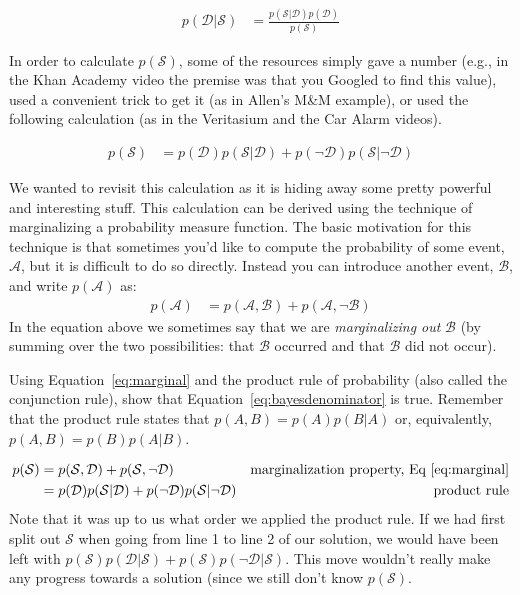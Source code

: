 \documentclass[assignment01_Solutions]{subfiles}
\begin{document}
\begin{align}
p(\mathcal{D} | \mathcal{S}) &= \frac{p(\mathcal{S} | \mathcal{D}) p(\mathcal{D})}{p(\mathcal{S})} \label{eq:bayesdenominator}
\end{align}

In order to calculate $p(\mathcal{S})$, some of the resources simply gave a number (e.g., in the Khan Academy video the premise was that you Googled to find this value), used a convenient trick to get it (as in Allen's M\&M example), or used the following calculation (as in the Veritasium and the Car Alarm videos).

\begin{align}
p(\mathcal{S}) &= p(\mathcal{D}) p(\mathcal{S}|\mathcal{D}) + p(\neg \mathcal{D}) p(\mathcal{S} | \neg \mathcal{D})
\end{align}

We wanted to revisit this calculation as it is hiding away some pretty powerful and interesting stuff.  This calculation can be derived using the technique of marginalizing a probability measure function.  The basic motivation for this technique is that sometimes you'd like to compute the probability of some event, $\mathcal{A}$, but it is difficult to do so directly.  Instead you can introduce another event, $\mathcal{B}$, and write $p(\mathcal{A})$ as:
\begin{align}
p(\mathcal{A}) &= p(\mathcal{A}, \mathcal{B}) + p(\mathcal{A}, \neg \mathcal{B}) \label{eq:marginal}
\end{align}
In the equation above we sometimes say that we are \emph{marginalizing out} $\mathcal{B}$ (by summing over the two possibilities: that $\mathcal{B}$ occurred and that $\mathcal{B}$ did not occur).

\begin{exercise}[(15 minutes)]
Using Equation~\ref{eq:marginal} and the product rule of probability (also called the conjunction rule), show that Equation~\ref{eq:bayesdenominator} is true.  Remember that the product rule states that $p(A,B) = p(A)p(B|A)$ or, equivalently, $p(A,B) = p(B)p(A|B)$.

\begin{boxedsolution}
\begin{align}
p(\mathcal{S}) &= p(\mathcal{S}, \mathcal{D}) + p(\mathcal{S}, \neg \mathcal{D}) & \mbox{marginalization property, Eq~\ref{eq:marginal}} \nonumber \\
&= p(\mathcal{D})p(\mathcal{S}|\mathcal{D}) + p(\neg \mathcal{D}) p(\mathcal{S} | \neg \mathcal{D})& \mbox{product rule} \nonumber
\end{align}
Note that it was up to us what order we applied the product rule.  If we had first split out $\mathcal{S}$ when going from line 1 to line 2 of our solution, we would have been left with $p(\mathcal{S})p(\mathcal{D}|\mathcal{S}) + p(\mathcal{S}) p(\neg \mathcal{D} | \mathcal{S})$.  This move wouldn't really make any progress towards a solution (since we still don't know $p(\mathcal{S})$.

\end{boxedsolution}
\end{exercise}
\end{document}
